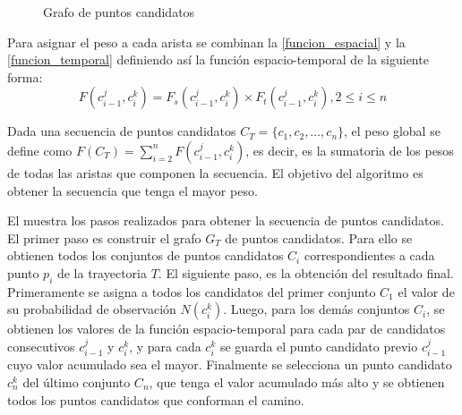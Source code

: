 \begin{figure}[h*]
	\centering
	
	\caption{\label{fig:grafo_de_candidatos} Grafo de puntos candidatos}	
\end{figure}

Para asignar el peso a cada arista se combinan la \cref{funcion_espacial} y la \cref{funcion_temporal} definiendo así la función espacio-temporal de la siguiente forma:
\begin{equation} \label{funcion_espacio_temporal}
F(c_{i-1}^{j},c_{i}^{k}) = F_s(c_{i-1}^{j},c_{i}^{k}) \times F_{ t }(c_{ i-1 }^{ j },c_{ i }^{ k }), 2 \leq i \leq n
\end{equation}

Dada una secuencia de puntos candidatos $C_T = \{c_1, c_2, \dots, c_n\}$, el peso global se define como $F(C_T) = \sum _{ i=2 }^{ n }{F(c_{i-1}^{j},c_{i}^{k})}$, es decir, es la sumatoria de los pesos de todas las aristas que componen la secuencia. El objetivo del algoritmo es obtener la secuencia que tenga el mayor peso.

El  muestra los pasos realizados para obtener la secuencia de puntos candidatos. El primer paso es construir el grafo $G_T$ de puntos candidatos. Para ello se obtienen todos los conjuntos de puntos candidatos $C_i$ correspondientes a cada punto $p_i$ de la trayectoria $T$. El siguiente paso, es la obtención del resultado final. Primeramente se asigna a todos los candidatos del primer conjunto $C_1$ el valor de su probabilidad de observación $N(c_i^k)$. Luego, para los demás conjuntos $C_i$, se obtienen los valores de la función espacio-temporal para cada par de candidatos consecutivos $c_{i-1}^j$ y $c_i^k$, y para cada $c_i^k$ se guarda el punto candidato previo $c_{i-1}^j$ cuyo valor acumulado sea el mayor. Finalmente se selecciona un punto candidato $c_n^k$ del último conjunto $C_n$, que tenga el valor acumulado más alto y se obtienen todos los puntos candidatos que conforman el camino.

